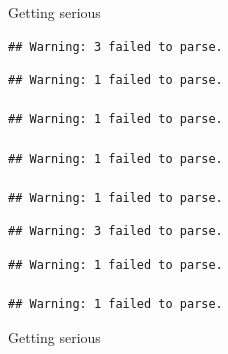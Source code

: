 \documentclass[ignorenonframetext,]{beamer}
\newenvironment{Shaded}{\begin{snugshade}}{\end{snugshade}}
\newcommand{\KeywordTok}[1]{\textcolor[rgb]{0.13,0.29,0.53}{\textbf{{#1}}}}
\newcommand{\DataTypeTok}[1]{\textcolor[rgb]{0.13,0.29,0.53}{{#1}}}
\newcommand{\DecValTok}[1]{\textcolor[rgb]{0.00,0.00,0.81}{{#1}}}
\newcommand{\FloatTok}[1]{\textcolor[rgb]{0.00,0.00,0.81}{{#1}}}
\newcommand{\StringTok}[1]{\textcolor[rgb]{0.31,0.60,0.02}{{#1}}}
\newcommand{\NormalTok}[1]{{#1}}
\begin{document}
\begin{frame}[fragile]{Getting serious}

\begin{Shaded}
\end{Shaded}

\begin{verbatim}
## Warning: 3 failed to parse.
\end{verbatim}

\begin{verbatim}
## Warning: 1 failed to parse.

## Warning: 1 failed to parse.

## Warning: 1 failed to parse.

## Warning: 1 failed to parse.
\end{verbatim}

\begin{verbatim}
## Warning: 3 failed to parse.
\end{verbatim}

\begin{verbatim}
## Warning: 1 failed to parse.

## Warning: 1 failed to parse.
\end{verbatim}

\end{frame}

\begin{frame}[fragile]{Getting serious}

\begin{Shaded}
\end{Shaded}

\end{frame}
\end{document}
